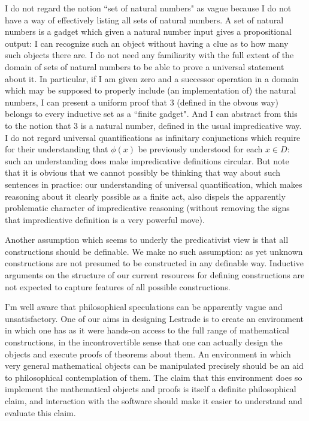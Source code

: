 \documentclass[12pt]{article}
\begin{document}
I do not regard the notion ``set of natural numbers" as vague because I do not have a way of effectively listing all sets of natural numbers.   A set of natural numbers is a gadget which given a natural number input gives a propositional output:  I can recognize such an object without having a clue as to how many such objects there are.  I do not need any familiarity with the full extent of the domain of sets of natural numbers to be able to prove a universal statement about it.   In particular, if I am given zero and a successor operation in a domain which may be supposed to properly include (an implementation of) the natural numbers, I can present a uniform proof that 3 (defined in the obvous way) belongs to every inductive set  as a ``finite gadget".  And I can abstract from this to the notion that 3 is a natural number, defined in the usual impredicative way.  I do not regard universal quantifications as infinitary conjunctions which require for their understanding that
$\phi(x)$ be previously understood for each $x \in D$:  such an understanding does make impredicative definitions circular.  But note that it is obvious that we cannot possibly be thinking that way about such sentences in practice:  our understanding of universal quantification, which makes reasoning about it clearly possible as a finite act, also dispels the apparently problematic character of impredicative reasoning (without removing the signs that impredicative definition  is a very powerful move).

Another assumption which seems to underly the predicativist view is that all constructions should be definable.  We make no such assumption: as yet unknown constructions are not presumed to be constructed in any definable way.  Inductive arguments on the structure of our current resources for defining constructions are not expected to capture features of all possible constructions.

I'm well aware that philosophical speculations can be apparently vague and unsatisfactory.  One of our aims in designing Lestrade is to create an environment in which one has as it were hands-on access to the full range of mathematical constructions, in the incontrovertible sense that one can actually design the objects and execute proofs of theorems  about them.  An environment in which very general mathematical objects can be manipulated precisely should be an aid to philosophical contemplation of them.  The claim that this environment does so implement the mathematical objects and proofs is itself a definite philosophical claim, and interaction with the software should make it easier to understand and evaluate this claim.
\end{document}
